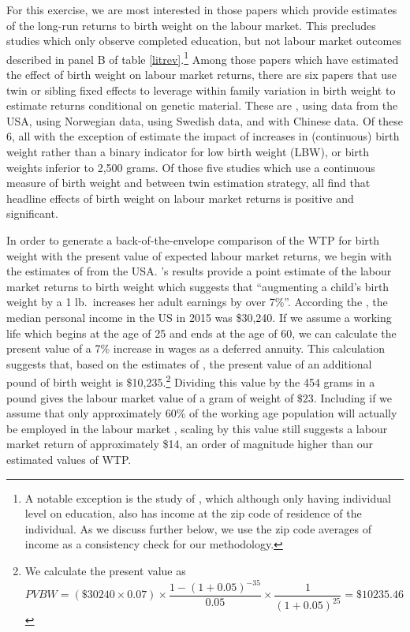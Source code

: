 \documentclass[a4paper, 11pt]{article}
\begin{document}
\begin{spacing}{1.4}
For this exercise, we are most interested in those papers which
provide estimates of the long-run returns to birth weight on the
labour market.  This precludes studies which only observe completed
education, but not labour market outcomes
described in panel B of table \ref{litrev}.\footnote{A notable
  exception is the study of \citet{Royer2009}, which although only
  having individual level on education, also has income at the zip
  code of residence of the individual.  As we discuss further below,
  we use the zip code averages of income as a consistency check for
  our methodology.} Among those papers which have estimated the effect
of birth weight on labour market returns, there are six papers that
use twin or sibling fixed effects to leverage within family variation
in birth weight to estimate returns conditional on genetic material.
These are \citet{BehrmanRosenzweig2004,JohnsonSchoeni2011,CookFletcher2015},
using data from the USA, \citet{Blacketal2007} using Norwegian data,
\citet{Bharadwajetal2015} using Swedish data, and
\citet{RosenzweigZhang2013} with Chinese data.  Of these 6, all with
the exception of \citet{JohnsonSchoeni2011} estimate
the impact of increases in (continuous) birth weight rather than
a binary indicator for low birth weight (LBW), or birth weights
inferior to 2,500 grams.  Of those five studies which use a continuous
measure of birth weight and between twin estimation strategy, all find
that headline effects of birth weight on labour market returns is positive
and significant.

In order to generate a back-of-the-envelope comparison of the WTP
for birth weight with the present value of expected labour market
returns, we begin with the estimates of \citet{BehrmanRosenzweig2004}
from the USA.  \citet{BehrmanRosenzweig2004}'s results provide
a point estimate of the labour market returns to birth weight which
suggests that ``augmenting a child's birth weight by a 1 lb.\ increases
her adult earnings by over 7\%''.  According the \citet{USCB2016},
the median personal income in the US in 2015 was \$30,240.  If we assume
a working life which begins at the age of 25 and ends at the age of
60, we can calculate the present value of a 7\% increase in wages as
a deferred annuity.  This calculation suggests that, based on the
estimates of \citet{BehrmanRosenzweig2004}, the present value of an
additional pound of birth weight is \$10,235.\footnote{We calculate the
  present value as
  \[
  PVBW = (\$30240\times0.07)\times\frac{1-(1+0.05)^{-35}}{0.05}\times\frac{1}{(1+0.05)^{25}}=\$10235.46
  \]
}  Dividing this value by the 454 grams in a pound gives the labour
market value of a gram of weight of $\$23$.  Including if we assume
that only approximately 60\% of the working age population will
actually be employed in the labour market \citep{BLS2017}, scaling
by this value still suggests a labour market return of approximately
\$14, an order of magnitude higher than our estimated values of WTP.


\end{spacing}
\end{document}
